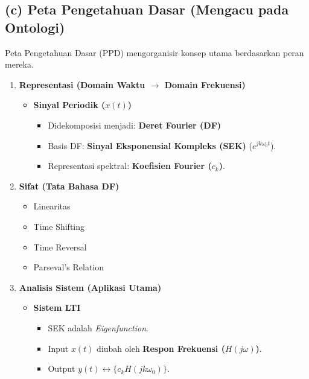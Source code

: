 \documentclass[
  letterpaper,
  DIV=11,
  numbers=noendperiod]{scrreprt}
\providecommand{\tightlist}{%
  \setlength{\itemsep}{0pt}\setlength{\parskip}{0pt}}
\begin{document}
\subsection{(c) Peta Pengetahuan Dasar (Mengacu pada
Ontologi)}\label{c-peta-pengetahuan-dasar-mengacu-pada-ontologi}

Peta Pengetahuan Dasar (PPD) mengorganisir konsep utama berdasarkan
peran mereka.

\begin{enumerate}
\def\labelenumi{\arabic{enumi}.}
\tightlist
\item
  \textbf{Representasi (Domain Waktu \(\rightarrow\) Domain Frekuensi)}

  \begin{itemize}
  \tightlist
  \item
    \textbf{Sinyal Periodik (\(x(t)\))}

    \begin{itemize}
    \tightlist
    \item
      Didekomposisi menjadi: \textbf{Deret Fourier (DF)}
    \item
      Basis DF: \textbf{Sinyal Eksponensial Kompleks (SEK)}
      (\(e^{jk\omega_0 t}\)).
    \item
      Representasi spektral: \textbf{Koefisien Fourier (\(c_k\))}.
    \end{itemize}
  \end{itemize}
\item
  \textbf{Sifat (Tata Bahasa DF)}

  \begin{itemize}
  \tightlist
  \item
    Linearitas
  \item
    Time Shifting
  \item
    Time Reversal
  \item
    Parseval's Relation
  \end{itemize}
\item
  \textbf{Analisis Sistem (Aplikasi Utama)}

  \begin{itemize}
  \tightlist
  \item
    \textbf{Sistem LTI}

    \begin{itemize}
    \tightlist
    \item
      SEK adalah \emph{Eigenfunction}.
    \item
      Input \(x(t)\) diubah oleh \textbf{Respon Frekuensi
      (\(H(j\omega)\))}.
    \item
      Output \(y(t) \leftrightarrow \{c_k H(jk\omega_0)\}\).
    \end{itemize}
  \end{itemize}
\end{enumerate}
\end{document}
